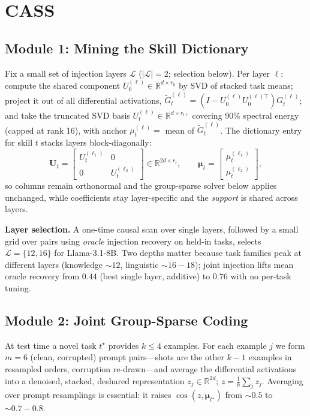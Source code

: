 \documentclass[sigconf,review,anonymous]{acmart}
\newcommand{\method}{\textsc{CASS}}
\newcommand{\R}{\mathbb{R}}
\begin{document}
\section{\method}
\subsection{Module 1: Mining the Skill Dictionary}
\label{sec:mining}
Fix a small set of injection layers $\mathcal L$ ($|\mathcal L|{=}2$;
selection below). Per layer $\ell$: compute the shared component
$U_0^{(\ell)}\in\R^{d\times r_0}$ by SVD of stacked task means; project it
out of all differential activations,
$\tilde G_t^{(\ell)}=(I-U_0^{(\ell)}U_0^{(\ell)\top})G_t^{(\ell)}$; and take
the truncated SVD basis $U_t^{(\ell)}\in\R^{d\times r_{t\ell}}$ covering 90\%
spectral energy (capped at rank 16), with anchor
$\mu_t^{(\ell)}=$ mean of $\tilde G_t^{(\ell)}$. The dictionary entry for
skill $t$ stacks layers block-diagonally:
\[
\mathbf U_t=\begin{bmatrix}U_t^{(\ell_1)} & 0\\[2pt] 0 &
U_t^{(\ell_2)}\end{bmatrix}\in\R^{2d\times r_t},\qquad
\boldsymbol\mu_t=\begin{bmatrix}\mu_t^{(\ell_1)}\\[2pt]
\mu_t^{(\ell_2)}\end{bmatrix},
\]
so columns remain orthonormal and the group-sparse solver below applies
unchanged, while coefficients stay layer-specific and the \emph{support} is
shared across layers.

\textbf{Layer selection.} A one-time causal scan over single layers, followed
by a small grid over pairs using \emph{oracle} injection recovery on held-in
tasks, selects $\mathcal L=\{12,16\}$ for Llama-3.1-8B. Two depths matter
because task families peak at different layers (knowledge ${\sim}12$,
linguistic ${\sim}16{-}18$); joint injection lifts mean oracle recovery from
$0.44$ (best single layer, additive) to $0.76$ with no per-task tuning.

\subsection{Module 2: Joint Group-Sparse Coding}
\label{sec:coding}
At test time a novel task $t^\star$ provides $k\le4$ examples. For each
example $j$ we form $m{=}6$ (clean, corrupted) prompt pairs---shots are the
other $k{-}1$ examples in resampled orders, corruption re-drawn---and average
the differential activations into a denoised, stacked, deshared
representation $z_j\in\R^{2d}$; $z=\frac1k\sum_j z_j$. Averaging over prompt
resamplings is essential: it raises $\cos(z,\boldsymbol\mu_{t^\star})$ from
${\sim}0.5$ to ${\sim}0.7{-}0.8$.
\end{document}
